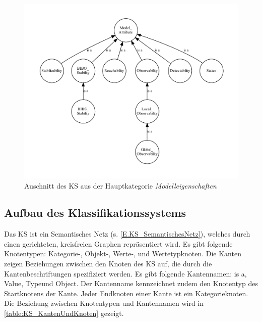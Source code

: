 \begin{figure}
	\centering
	\includegraphics[width=0.9\linewidth]{Ausschnitt_KS_Attributes}
	\caption{Auschnitt des KS aus der Hauptkategorie \textit{Modelleigenschaften}}
	\label{fig:KS_AttributesSnippet}
\end{figure}

\subsection{Aufbau des Klassifikationssystems}
\label{Ch:Ergebniss:Sec:KS:SubSec:Aufbau}
Das KS ist ein Semantisches Netz (s. \autoref{E.KS_SemantischesNetz}), welches durch einen gerichteten, kreisfreien Graphen repräsentiert wird. Es gibt folgende Knotentypen: Kategorie-, Objekt-, Werte-, und Wertetypknoten. 
Die Kanten zeigen Beziehungen zwischen den Knoten des KS auf, die durch die Kantenbeschriftungen spezifiziert werden. Es gibt folgende Kantennamen: \glqq is a\grqq, \glqq Value\grqq, \glqq Type\grqq und \glqq Object\grqq. Der Kantenname kennzeichnet zudem den Knotentyp des Startknotens der Kante. Jeder Endknoten einer Kante ist ein Kategorieknoten. Die Beziehung zwischen Knotentypen und Kantennamen wird in \autoref{table:KS_KantenUndKnoten} gezeigt.

